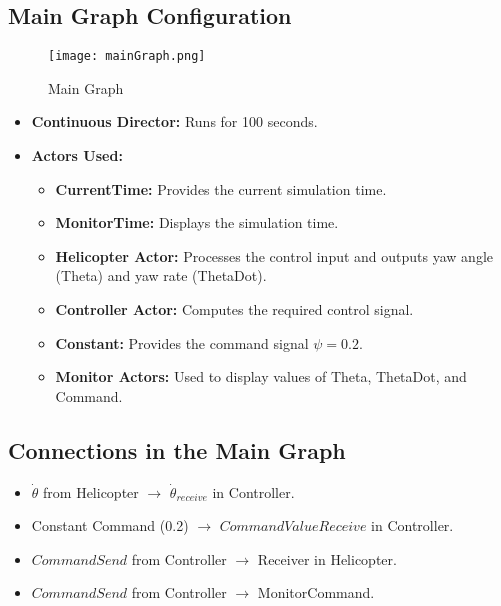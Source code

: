 \documentclass{article}
\begin{document}
\subsection{Main Graph Configuration}
\begin{figure}
    \centering
    \texttt{[image: mainGraph.png]}
    \caption{Main Graph}
    \label{fig:enter-label}
\end{figure}
\begin{itemize}
    \item \textbf{Continuous Director:} Runs for 100 seconds.
    \item \textbf{Actors Used:}
    \begin{itemize}
        \item \textbf{CurrentTime:} Provides the current simulation time.
        \item \textbf{MonitorTime:} Displays the simulation time.
        \item \textbf{Helicopter Actor:} Processes the control input and outputs yaw angle (Theta) and yaw rate (ThetaDot).
        \item \textbf{Controller Actor:} Computes the required control signal.
        \item \textbf{Constant:} Provides the command signal $\psi = 0.2$.
        \item \textbf{Monitor Actors:} Used to display values of Theta, ThetaDot, and Command.
    \end{itemize}
\end{itemize}

\subsection{Connections in the Main Graph}
\begin{itemize}
    \item $\dot{\theta}$ from Helicopter $\rightarrow$ $\dot{\theta}_{receive}$ in Controller.
    \item Constant Command (0.2) $\rightarrow$ $CommandValueReceive$ in Controller.
    \item $CommandSend$ from Controller $\rightarrow$ Receiver in Helicopter.
    \item $CommandSend$ from Controller $\rightarrow$ MonitorCommand.
\end{itemize}
\end{document}
